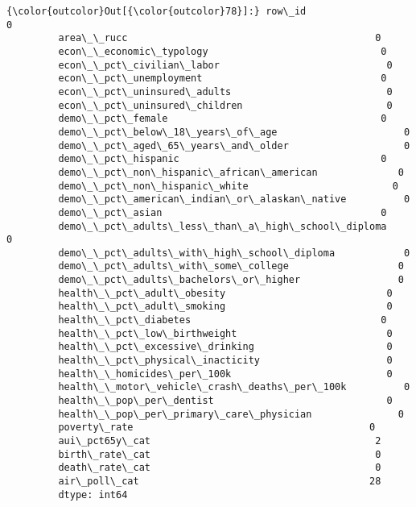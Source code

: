 \documentclass[11pt]{article}
\begin{document}
\begin{Verbatim}[commandchars=\\\{\}]
{\color{outcolor}Out[{\color{outcolor}78}]:} row\_id                                               0
         area\_\_rucc                                           0
         econ\_\_economic\_typology                              0
         econ\_\_pct\_civilian\_labor                             0
         econ\_\_pct\_unemployment                               0
         econ\_\_pct\_uninsured\_adults                           0
         econ\_\_pct\_uninsured\_children                         0
         demo\_\_pct\_female                                     0
         demo\_\_pct\_below\_18\_years\_of\_age                      0
         demo\_\_pct\_aged\_65\_years\_and\_older                    0
         demo\_\_pct\_hispanic                                   0
         demo\_\_pct\_non\_hispanic\_african\_american              0
         demo\_\_pct\_non\_hispanic\_white                         0
         demo\_\_pct\_american\_indian\_or\_alaskan\_native          0
         demo\_\_pct\_asian                                      0
         demo\_\_pct\_adults\_less\_than\_a\_high\_school\_diploma     0
         demo\_\_pct\_adults\_with\_high\_school\_diploma            0
         demo\_\_pct\_adults\_with\_some\_college                   0
         demo\_\_pct\_adults\_bachelors\_or\_higher                 0
         health\_\_pct\_adult\_obesity                            0
         health\_\_pct\_adult\_smoking                            0
         health\_\_pct\_diabetes                                 0
         health\_\_pct\_low\_birthweight                          0
         health\_\_pct\_excessive\_drinking                       0
         health\_\_pct\_physical\_inacticity                      0
         health\_\_homicides\_per\_100k                           0
         health\_\_motor\_vehicle\_crash\_deaths\_per\_100k          0
         health\_\_pop\_per\_dentist                              0
         health\_\_pop\_per\_primary\_care\_physician               0
         poverty\_rate                                         0
         aui\_pct65y\_cat                                       2
         birth\_rate\_cat                                       0
         death\_rate\_cat                                       0
         air\_poll\_cat                                        28
         dtype: int64
\end{Verbatim}
            
\end{document}
